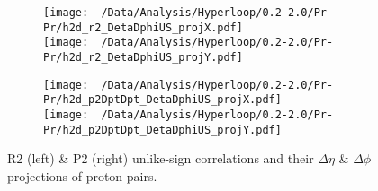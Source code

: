 \documentclass[12pt,a4paper,twoside]{report}
\begin{document}
\begin{figure}[H]
	\ContinuedFloat
	\begin{subfigure}{0.49\linewidth}
		\texttt{[image: ~/Data/Analysis/Hyperloop/0.2-2.0/Pr-Pr/h2d\_r2\_DetaDphiUS\_projX.pdf]}\\
		\texttt{[image: ~/Data/Analysis/Hyperloop/0.2-2.0/Pr-Pr/h2d\_r2\_DetaDphiUS\_projY.pdf]}\\
	\end{subfigure}
	\begin{subfigure}{0.49\linewidth}
		\texttt{[image: ~/Data/Analysis/Hyperloop/0.2-2.0/Pr-Pr/h2d\_p2DptDpt\_DetaDphiUS\_projX.pdf]}\\
		\texttt{[image: ~/Data/Analysis/Hyperloop/0.2-2.0/Pr-Pr/h2d\_p2DptDpt\_DetaDphiUS\_projY.pdf]}\\
	\end{subfigure}
	\caption{R2 (left) \& P2 (right) unlike-sign correlations and their $\Delta\eta$ \& $\Delta\phi$ projections of proton pairs.}
\end{figure}
\end{document}
